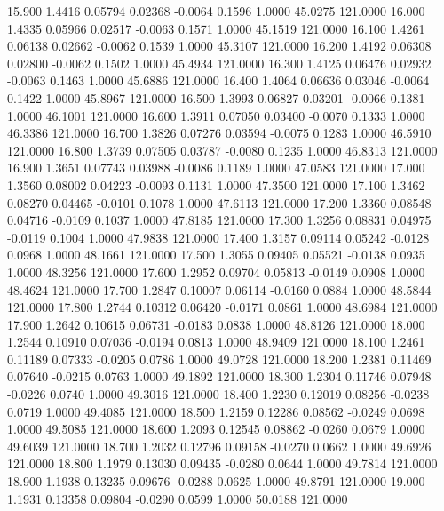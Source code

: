   15.900   1.4416   0.05794   0.02368  -0.0064   0.1596   1.0000  45.0275 121.0000
  16.000   1.4335   0.05966   0.02517  -0.0063   0.1571   1.0000  45.1519 121.0000
  16.100   1.4261   0.06138   0.02662  -0.0062   0.1539   1.0000  45.3107 121.0000
  16.200   1.4192   0.06308   0.02800  -0.0062   0.1502   1.0000  45.4934 121.0000
  16.300   1.4125   0.06476   0.02932  -0.0063   0.1463   1.0000  45.6886 121.0000
  16.400   1.4064   0.06636   0.03046  -0.0064   0.1422   1.0000  45.8967 121.0000
  16.500   1.3993   0.06827   0.03201  -0.0066   0.1381   1.0000  46.1001 121.0000
  16.600   1.3911   0.07050   0.03400  -0.0070   0.1333   1.0000  46.3386 121.0000
  16.700   1.3826   0.07276   0.03594  -0.0075   0.1283   1.0000  46.5910 121.0000
  16.800   1.3739   0.07505   0.03787  -0.0080   0.1235   1.0000  46.8313 121.0000
  16.900   1.3651   0.07743   0.03988  -0.0086   0.1189   1.0000  47.0583 121.0000
  17.000   1.3560   0.08002   0.04223  -0.0093   0.1131   1.0000  47.3500 121.0000
  17.100   1.3462   0.08270   0.04465  -0.0101   0.1078   1.0000  47.6113 121.0000
  17.200   1.3360   0.08548   0.04716  -0.0109   0.1037   1.0000  47.8185 121.0000
  17.300   1.3256   0.08831   0.04975  -0.0119   0.1004   1.0000  47.9838 121.0000
  17.400   1.3157   0.09114   0.05242  -0.0128   0.0968   1.0000  48.1661 121.0000
  17.500   1.3055   0.09405   0.05521  -0.0138   0.0935   1.0000  48.3256 121.0000
  17.600   1.2952   0.09704   0.05813  -0.0149   0.0908   1.0000  48.4624 121.0000
  17.700   1.2847   0.10007   0.06114  -0.0160   0.0884   1.0000  48.5844 121.0000
  17.800   1.2744   0.10312   0.06420  -0.0171   0.0861   1.0000  48.6984 121.0000
  17.900   1.2642   0.10615   0.06731  -0.0183   0.0838   1.0000  48.8126 121.0000
  18.000   1.2544   0.10910   0.07036  -0.0194   0.0813   1.0000  48.9409 121.0000
  18.100   1.2461   0.11189   0.07333  -0.0205   0.0786   1.0000  49.0728 121.0000
  18.200   1.2381   0.11469   0.07640  -0.0215   0.0763   1.0000  49.1892 121.0000
  18.300   1.2304   0.11746   0.07948  -0.0226   0.0740   1.0000  49.3016 121.0000
  18.400   1.2230   0.12019   0.08256  -0.0238   0.0719   1.0000  49.4085 121.0000
  18.500   1.2159   0.12286   0.08562  -0.0249   0.0698   1.0000  49.5085 121.0000
  18.600   1.2093   0.12545   0.08862  -0.0260   0.0679   1.0000  49.6039 121.0000
  18.700   1.2032   0.12796   0.09158  -0.0270   0.0662   1.0000  49.6926 121.0000
  18.800   1.1979   0.13030   0.09435  -0.0280   0.0644   1.0000  49.7814 121.0000
  18.900   1.1938   0.13235   0.09676  -0.0288   0.0625   1.0000  49.8791 121.0000
  19.000   1.1931   0.13358   0.09804  -0.0290   0.0599   1.0000  50.0188 121.0000

